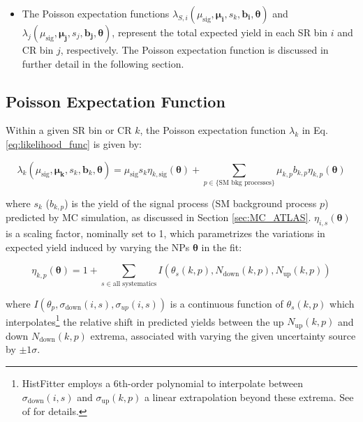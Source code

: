 \begin{itemize}
    \item The Poisson expectation functions \(\lambda_{S,i}(\mu_\text{sig}, \boldsymbol{\mu_i}, s_k, \boldsymbol{b_i}, \boldsymbol{\theta})\) and \(\lambda_j(\mu_\text{sig}, \boldsymbol{\mu_j}, s_j, \boldsymbol{b_j}, \boldsymbol{\theta})\), represent the total expected yield in each SR bin \(i\) and CR bin \(j\), respectively. The Poisson expectation function is discussed in further detail in the following section.
\end{itemize}

\subsection{Poisson Expectation Function}
\label{sec:poisson_exp}

Within a given SR bin or CR \(k\), the Poisson expectation function \(\lambda_k\) in Eq. \ref{eq:likelihood_func} is given by:
    
\begin{equation}
\label{eq:lambda}
        \lambda_k(\mu_\text{sig}, \boldsymbol{\mu_k}, s_k, \boldsymbol{b}_k, \boldsymbol{\theta}) = \mu_\text{sig}s_k\eta_{k, \text{sig}}(\boldsymbol{\theta}) + \sum\limits_{p\in{\text{\{SM bkg processes\}}}} \mu_{k,p} b_{k,p}\eta_{k,p}(\boldsymbol{\theta})
\end{equation}
    
\noindent where \(s_k\) (\(b_{k,p}\)) is the yield of the signal process (SM background process \(p\)) predicted by MC simulation, as discussed in Section \ref{sec:MC_ATLAS}. \(\eta_{i,s}(\boldsymbol{\theta})\) is a scaling factor, nominally set to 1, which parametrizes the variations in expected yield induced by varying the NPs \(\boldsymbol{\theta}\) in the fit:

        \begin{equation}
            \label{eq:sigma}
            \eta_{k,p}(\boldsymbol{\theta}) = 1 + \sum_{s\in\text{all systematics}}I(\theta_s(k,p), N_\text{down}(k,p), N_\text{up}(k,p))
        \end{equation}

        where \(I(\theta_p, \sigma_\text{down}(i,s), \sigma_{up}(i,s))\) is a continuous function of \(\theta_s(k,p)\) which interpolates\footnote{HistFitter employs a 6th-order polynomial to interpolate between  \(\sigma_\text{down}(i,s)\) and \(\sigma_\text{up}(k,p)\) a linear extrapolation beyond these extrema. See  of  for details.} the relative shift in predicted yields between the up \(N_\text{up}(k, p)\) and down \(N_\text{down}(k, p)\) extrema, associated with varying the given uncertainty source by \(\pm1\sigma\). 

